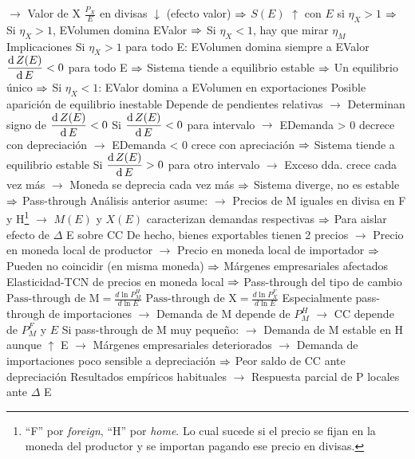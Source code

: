 \documentclass{nuevotema}
\begin{document}
\begin{esquemal}
				\4[] $\to$ Valor de X $\frac{P_X}{E}$ en divisas $\downarrow$ (efecto valor)
				\4[] $\Rightarrow$ $S(E)$ $\uparrow$ con $E$ si $\eta_X > 1$
				\4[] $\Rightarrow$ Si $\eta_X > 1$, EVolumen domina EValor
				\4[] $\Rightarrow$ Si $\eta_X < 1$, hay que mirar $\eta_M$
			\3 Implicaciones
				\4 Si $\eta_X > 1$ para todo E:
				\4[] EVolumen domina siempre a EValor
				\4[] $\dfrac{\text{d} \, Z(E)}{\text{d} \, E} < 0$ para todo E
				\4[] $\Rightarrow$ Sistema tiende a equilibrio estable
				\4[] $\Rightarrow$ Un equilibrio único
				\4[] $\Rightarrow$ 
				\4 Si $\eta_X < 1$:
				\4[] EValor domina a EVolumen en exportaciones
				\4[] Posible aparición de equilibrio inestable
				\4[] Depende de pendientes relativas
				\4[] $\to$ Determinan signo de $\dfrac{\text{d} \, Z(E)}{\text{d} \, E} < 0$
				\4[] Si $\dfrac{\text{d} \, Z(E)}{\text{d} \, E} < 0$ para intervalo
				\4[] $\to$ EDemanda > 0 decrece con depreciación
				\4[] $\to$ EDemanda < 0 crece con apreciación
				\4[] $\Rightarrow$ Sistema tiende a equilibrio estable
				\4[] Si $\dfrac{\text{d} \, Z(E)}{\text{d} \, E} > 0 $ para otro intervalo
				\4[] $\to$ Exceso dda. crece cada vez más
				\4[] $\to$ Moneda se deprecia cada vez más
				\4[] $\Rightarrow$ Sistema diverge, no es estable
				\4[] $\Rightarrow$ 
				\4 Pass-through
				\4[] Análisis anterior asume:
				\4[] $\to$ Precios de M iguales en divisa en F y H\footnote{``F'' por \textit{foreign}, ``H'' por \textit{home}. Lo cual sucede si el precio se fijan en la moneda del productor y se importan pagando ese precio en divisas.}
				\4[] $\to$ $M(E)$ y $X(E)$ caracterizan demandas respectivas
				\4[] $\Rightarrow$ Para aislar efecto de $\Delta$ E sobre CC
				\4[] De hecho, bienes exportables tienen 2 precios
				\4[] $\to$ Precio en moneda local de productor
				\4[] $\to$ Precio en moneda local de importador
				\4[] $\Rightarrow$ Pueden no coincidir (en misma moneda)
				\4[] $\Rightarrow$ Márgenes empresariales afectados
				\4[] Elasticidad-TCN de precios en moneda local
				\4[] $\Rightarrow$ Pass-through del tipo de cambio
				\4[] $\text{Pass-through de M} = \frac{d \ln P_M^H}{d \ln E}$
				\4[] $\text{Pass-through de X} = \frac{d \ln P_X^F}{d \ln E}$
				\4[] Especialmente pass-through de importaciones
				\4[] $\to$ Demanda de M depende de $P_M^H$
				\4[] $\to$ CC depende de $P_M^F$ y $E$
				\4[] Si pass-through de M muy pequeño:
				\4[] $\to$ Demanda de M estable en H aunque $\uparrow$ E
				\4[] $\to$ Márgenes empresariales deteriorados
				\4[] $\to$ Demanda de importaciones poco sensible a depreciación
				\4[] $\Rightarrow$ Peor saldo de CC ante depreciación
				\4[] Resultados empíricos habituales
				\4[] $\to$ Respuesta parcial de P locales ante $\Delta$ E

\end{esquemal}
\end{document}
